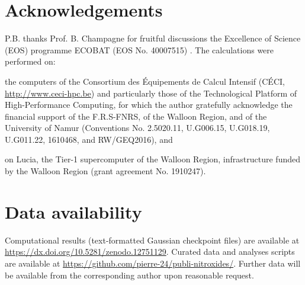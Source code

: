 \documentclass[review,preprint]{elsarticle}
\begin{document}
\section*{Acknowledgements}
P.B. thanks Prof. B. Champagne for fruitful discussions the Excellence of Science (EOS) programme  ECOBAT (EOS No. 40007515) . 
The calculations were performed on: \begin{inparaenum}[(i)]
	\item the computers of the Consortium des \'{E}quipements de Calcul Intensif (C\'{E}CI, \url{http://www.ceci-hpc.be}) and particularly those of the Technological Platform of High-Performance Computing, for which the author gratefully acknowledge the financial support of the F.R.S-FNRS, of the Walloon Region, and of the University of Namur (Conventions No. 2.5020.11, U.G006.15, U.G018.19, U.G011.22, 1610468, and RW/GEQ2016), and
	\item on Lucia, the Tier-1 supercomputer of the Walloon Region, infrastructure funded by the Walloon Region (grant agreement No. 1910247).
\end{inparaenum} 

\section*{Data availability}

Computational results (text-formatted Gaussian checkpoint files) are available at \url{https://dx.doi.org/10.5281/zenodo.12751129}.
Curated data and analyses scripts are available at \url{https://github.com/pierre-24/publi-nitroxides/}.
Further data will be available from the corresponding author upon reasonable request.
	

 

	
\end{document}
